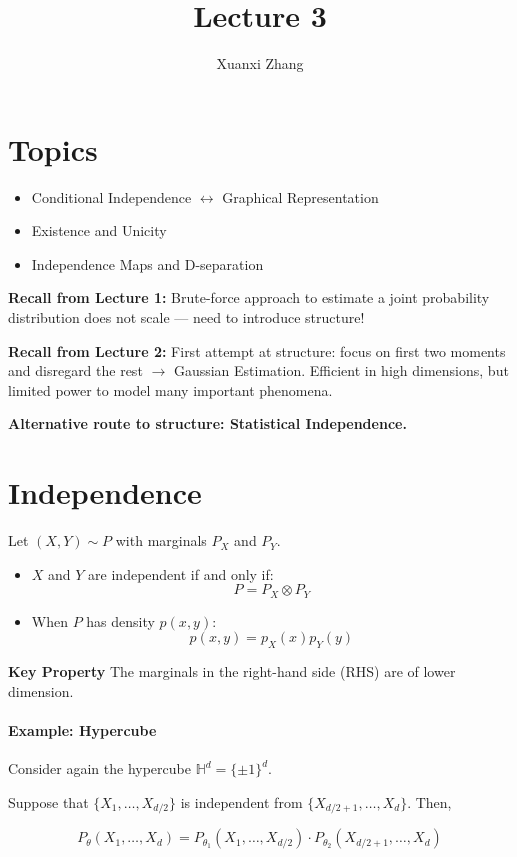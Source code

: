 \documentclass{article}%
\title{\huge Lecture 3 \\
\normalsize}
\author{Xuanxi Zhang}
\begin{document}
\maketitle
\section*{Topics}
\begin{itemize}
    \item Conditional Independence $\leftrightarrow$ Graphical Representation
    \item Existence and Unicity
    \item Independence Maps and D-separation
\end{itemize}

\textbf{Recall from Lecture 1:} Brute-force approach to estimate a joint probability distribution does not scale — need to introduce structure!

\textbf{Recall from Lecture 2:} First attempt at structure: focus on first two moments and disregard the rest $\rightarrow$ Gaussian Estimation. Efficient in high dimensions, but limited power to model many important phenomena.

\textbf{Alternative route to structure: Statistical Independence.}

\section{Independence}
Let $(X, Y) \sim P$ with marginals $P_X$ and $P_Y$.

\begin{itemize}
    \item $X$ and $Y$ are independent if and only if:
    \[
    P = P_X \otimes P_Y
    \]
    \item When $P$ has density $p(x,y)$:
    \[
    p(x,y) = p_X(x) p_Y(y)
    \]
\end{itemize}

\textbf{Key Property}
The marginals in the right-hand side (RHS) are of lower dimension.

\paragraph{Example: Hypercube}
Consider again the hypercube $\mathbb{H}^d = \{ \pm 1 \}^d$.

Suppose that $\{ X_1, \dots, X_{d/2} \}$ is independent from $\{ X_{d/2+1}, \dots, X_d \}$. Then,

\[
P_{\theta}(X_1, \dots, X_d) = P_{\theta_1}(X_1, \dots, X_{d/2}) \cdot P_{\theta_2}(X_{d/2+1}, \dots, X_d)
\]
\end{document}
